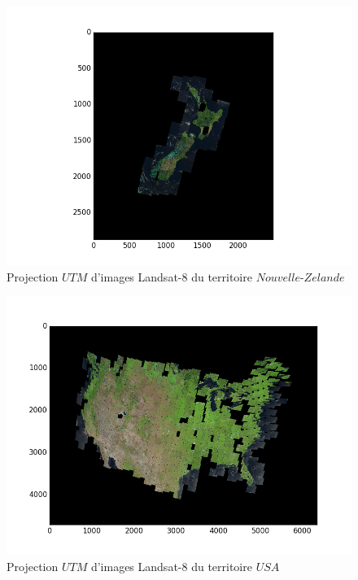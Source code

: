 \documentclass{book}
\begin{document}
\begin{figure}[H]
\begin{center}
\includegraphics[scale=0.8]{images/projection_newzealand.png}
\end{center}
\caption{Projection $UTM$ d'images Landsat-8 du territoire $Nouvelle$-$Zelande$}
\label{projection_newzealand}
\end{figure}
\begin{figure}[H]
\begin{center}
\includegraphics[scale=0.8]{images/projection_usa.png}
\end{center}
\caption{Projection $UTM$ d'images Landsat-8 du territoire $USA$}
\label{projection_usa}
\end{figure}
\end{document}
